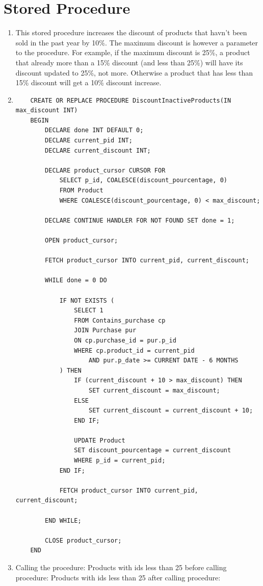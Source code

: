 \documentclass[a4paper,11pt]{article}
\begin{document}
\section*{Stored Procedure}

\begin{enumerate}[label=(\alph*)]
    \item This stored procedure increases the discount of products that havn't been sold in the past year by 10\%. The maximum discount is however a parameter to the procedure. 
    For example, if the maximum discount is 25\%, a product that already more than a 15\% discount (and less than 25\%) will have its discount updated to 25\%, not more. 
    Otherwise a product that has less than 15\% discount will get a 10\% discount increase.
    \item 
    \begin{lstlisting}
    CREATE OR REPLACE PROCEDURE DiscountInactiveProducts(IN max_discount INT)
    BEGIN
        DECLARE done INT DEFAULT 0;
        DECLARE current_pid INT;
        DECLARE current_discount INT;
    
        DECLARE product_cursor CURSOR FOR
            SELECT p_id, COALESCE(discount_pourcentage, 0)
            FROM Product
            WHERE COALESCE(discount_pourcentage, 0) < max_discount;
    
        DECLARE CONTINUE HANDLER FOR NOT FOUND SET done = 1;
    
        OPEN product_cursor;
    
        FETCH product_cursor INTO current_pid, current_discount;
    
        WHILE done = 0 DO
    
            IF NOT EXISTS (
                SELECT 1
                FROM Contains_purchase cp
                JOIN Purchase pur 
                ON cp.purchase_id = pur.p_id
                WHERE cp.product_id = current_pid
                    AND pur.p_date >= CURRENT DATE - 6 MONTHS
            ) THEN
                IF (current_discount + 10 > max_discount) THEN
                    SET current_discount = max_discount;
                ELSE 
                    SET current_discount = current_discount + 10;
                END IF;
    
                UPDATE Product
                SET discount_pourcentage = current_discount
                WHERE p_id = current_pid;
            END IF;
    
            FETCH product_cursor INTO current_pid, current_discount;
    
        END WHILE;
    
        CLOSE product_cursor;
    END
    \end{lstlisting}
    
    \item Calling the procedure: 
    Products with ids less than 25 before calling procedure: 
    Products with ids less than 25 after calling procedure:
\end{enumerate}
\end{document}
